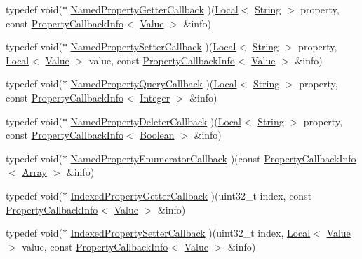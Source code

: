 \begin{DoxyCompactItemize}
\item 
typedef void($\ast$ \hyperlink{namespacev8_a6989c9687ac7466f840e625f5492effd}{Named\-Property\-Getter\-Callback} )(\hyperlink{classv8_1_1Local}{Local}$<$ \hyperlink{classv8_1_1String}{String} $>$ property, const \hyperlink{classv8_1_1PropertyCallbackInfo}{Property\-Callback\-Info}$<$ \hyperlink{classv8_1_1Value}{Value} $>$ \&info)
\item 
typedef void($\ast$ \hyperlink{namespacev8_acdec7bf35a4829e093c715f06abedb04}{Named\-Property\-Setter\-Callback} )(\hyperlink{classv8_1_1Local}{Local}$<$ \hyperlink{classv8_1_1String}{String} $>$ property, \hyperlink{classv8_1_1Local}{Local}$<$ \hyperlink{classv8_1_1Value}{Value} $>$ value, const \hyperlink{classv8_1_1PropertyCallbackInfo}{Property\-Callback\-Info}$<$ \hyperlink{classv8_1_1Value}{Value} $>$ \&info)
\item 
typedef void($\ast$ \hyperlink{namespacev8_a4898f3b36dba46aa71ee27fdeaa97d23}{Named\-Property\-Query\-Callback} )(\hyperlink{classv8_1_1Local}{Local}$<$ \hyperlink{classv8_1_1String}{String} $>$ property, const \hyperlink{classv8_1_1PropertyCallbackInfo}{Property\-Callback\-Info}$<$ \hyperlink{classv8_1_1Integer}{Integer} $>$ \&info)
\item 
typedef void($\ast$ \hyperlink{namespacev8_a9936b2995e132587514c4ed68a6b75c9}{Named\-Property\-Deleter\-Callback} )(\hyperlink{classv8_1_1Local}{Local}$<$ \hyperlink{classv8_1_1String}{String} $>$ property, const \hyperlink{classv8_1_1PropertyCallbackInfo}{Property\-Callback\-Info}$<$ \hyperlink{classv8_1_1Boolean}{Boolean} $>$ \&info)
\item 
typedef void($\ast$ \hyperlink{namespacev8_a3e95283903632a838e4df2b4b915a545}{Named\-Property\-Enumerator\-Callback} )(const \hyperlink{classv8_1_1PropertyCallbackInfo}{Property\-Callback\-Info}$<$ \hyperlink{classv8_1_1Array}{Array} $>$ \&info)
\item 
typedef void($\ast$ \hyperlink{namespacev8_a44546925ba002b2296a0ef25794003ef}{Indexed\-Property\-Getter\-Callback} )(uint32\-\_\-t index, const \hyperlink{classv8_1_1PropertyCallbackInfo}{Property\-Callback\-Info}$<$ \hyperlink{classv8_1_1Value}{Value} $>$ \&info)
\item 
typedef void($\ast$ \hyperlink{namespacev8_a15b00cf8b0a84a46c7f3b3bc807fb901}{Indexed\-Property\-Setter\-Callback} )(uint32\-\_\-t index, \hyperlink{classv8_1_1Local}{Local}$<$ \hyperlink{classv8_1_1Value}{Value} $>$ value, const \hyperlink{classv8_1_1PropertyCallbackInfo}{Property\-Callback\-Info}$<$ \hyperlink{classv8_1_1Value}{Value} $>$ \&info)

\end{DoxyCompactItemize}
